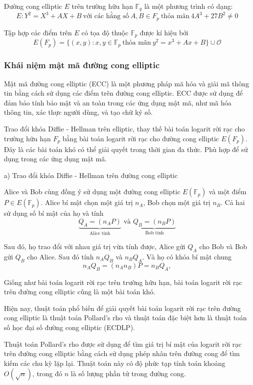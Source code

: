 Đường cong elliptic $E$ trên trường hữu hạn $\mathbb{F}_q$ là một phương trình có dạng:
$$E: Y^2 = X^3 + AX + B\ \text{với các hằng số}\ A, B \in F_p\ \text{thỏa mãn}\ 4A^3 + 27B^2 \neq 0$$

Tập hợp các điểm trên $E$ có tọa độ thuộc $\mathbb{F} _p$ được kí hiệu bởi
$$E(F_p) = \{(x, y) : x, y \in \mathbb{F}_p\ \text{thỏa mãn}\ y^2 = x^3 + A x + B\} \cup \mathcal{O}$$

\subsubsection{Khái niệm mật mã đường cong elliptic}
Mật mã đường cong elliptic (ECC) 
là một phương pháp mã hóa và giải mã thông tin bằng cách sử dụng các 
điểm trên đường cong elliptic. ECC được sử dụng để đảm bảo tính bảo 
mật và an toàn trong các ứng dụng mật mã, như mã hóa thông tin, xác thực người dùng, và tạo chữ ký số.

Trao đổi khóa Diffie - Hellman trên elliptic, thay thế bài toán logarit rời
rạc cho trường hữu hạn $F_p$ bằng bài toán logarit rời rạc cho đường cong elliptic $E(F_p)$.
Đây là các bài toán khó có thể giải quyết trong thời gian đa thức. Phù 
hợp để sử dụng trong các ứng dụng mật mã.

a) Trao đổi khóa Diffie - Hellman trên đường cong elliptic

	Alice và Bob cùng đồng ý sử dụng một đường cong elliptic $E (\mathbb{F}_p)$ và một điểm $P \in E (\mathbb{F}_p)$.
	Alice bí mật chọn một giá trị $n_A$, Bob chọn một giá trị $n_B$. Cả hai sử dụng số bí mật của họ và tính
$$\underbrace{Q_A = (n_AP)}_{\text{Alice tính}} \text{ và } \underbrace{Q_B = (n_BP)}_{\text{Bob tính}}$$

Sau đó, họ trao đổi với nhau giá trị vừa tính được, Alice gửi $Q_A$ cho Bob và Bob gửi
$Q_B$ cho Alice. Sau đó tính $n_A Q_B$ và $ n_BQ_A $.
Và họ có khóa bí mật chung
$$ n_AQ_B = (n_An_B)P = n_BQ_A,$$

Giống như bài toán logarit rời rạc trên trường hữu hạn, bài toán logarit rời rạc trên đường cong elliptic 
cũng là một bài toán khó. 

Hiện nay, thuật toán phổ biến để giải quyết bài toán logarit rời rạc 
trên đường cong elliptic là thuật toán Pollard's rho và thuật toán 
đặc biệt hơn là thuật toán số học đại số đường cong elliptic (ECDLP).

Thuật toán Pollard's rho được sử dụng để tìm giá trị bí mật của 
logarit rời rạc trên đường cong elliptic bằng cách sử dụng phép 
nhân trên đường cong để tìm kiếm các chu kỳ lặp lại. Thuật toán này 
có độ phức tạp tính toán khoảng $O(\sqrt n)$, trong đó $n$ là số lượng 
phần tử trong đường cong.

